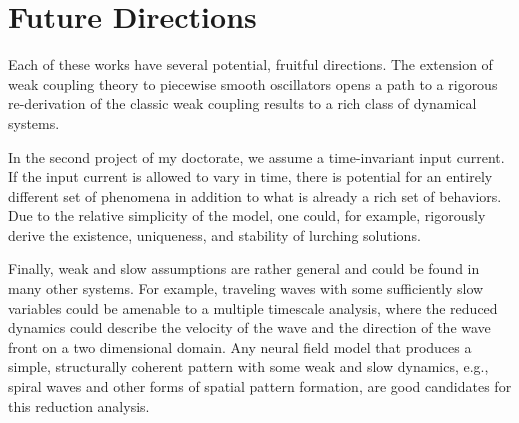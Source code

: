 \documentclass[a4paper,11pt]{article}
\begin{document}
\section{Future Directions}
Each of these works have several potential, fruitful directions. The extension of weak coupling theory to piecewise smooth oscillators opens a path to a rigorous re-derivation of the classic weak coupling results to a rich class of dynamical systems.

In the second project of my doctorate, we assume a time-invariant input current. If the input current is allowed to vary in time, there is potential for an entirely different set of phenomena in addition to what is already a rich set of behaviors. Due to the relative simplicity of the model, one could, for example, rigorously derive the existence, uniqueness, and stability of lurching solutions.

Finally, weak and slow assumptions are rather general and could be found in many other systems. For example, traveling waves with some sufficiently slow variables could be amenable to a multiple timescale analysis, where the reduced dynamics could describe the velocity of the wave and the direction of the wave front on a two dimensional domain. Any neural field model that produces a simple, structurally coherent pattern with some weak and slow dynamics, e.g., spiral waves and other forms of spatial pattern formation, are good candidates for this reduction analysis.




\end{document}
